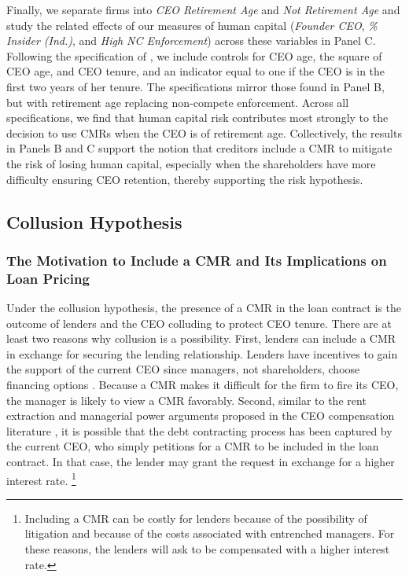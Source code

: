 \documentclass[a4paper,12pt]{article}
\begin{document}
Finally, we separate firms into \textit{CEO Retirement Age} and \textit{Not Retirement Age} and study the related effects of our measures of human capital (\textit{Founder CEO}, \textit{\% Insider (Ind.)}, and \textit{High NC Enforcement}) across these variables in Panel C.
Following the specification of \cite{Jenter_2015a}, we include controls for CEO age, the square of CEO age, and CEO tenure, and an indicator equal to one if the CEO is in the first two years of her tenure.
The specifications mirror those found in Panel B, but with retirement age replacing non-compete enforcement.
Across all specifications, we find that human capital risk contributes most strongly to the decision to use CMRs when the CEO is of retirement age.
Collectively, the results in Panels B and C support the notion that creditors include a CMR to mitigate the risk of losing human capital, especially when the shareholders have more difficulty ensuring CEO retention, thereby supporting the risk hypothesis.






\subsection{Collusion Hypothesis}

\subsubsection{The Motivation to Include a CMR and Its Implications on Loan Pricing}

Under the collusion hypothesis, the presence of a CMR in the loan contract is the outcome of lenders and the CEO colluding to protect CEO tenure.
There are at least two reasons why collusion is a possibility.
First, lenders can include a CMR in exchange for securing the lending relationship.
Lenders have incentives to gain the support of the current CEO since managers, not shareholders, choose financing options \citep{Novaes_2003}.
Because a CMR makes it difficult for the firm to fire its CEO, the manager is likely to view a CMR favorably. 
Second, similar to the rent extraction and managerial power arguments proposed in the CEO compensation literature \citep[see, e.g.,][]{Bebchuk_2003}, it is possible that the debt contracting process has been captured by the current CEO, who simply petitions for a CMR to be included in the loan contract.
In that case, the lender may grant the request in exchange for a higher interest rate.%
    \footnote{Including a CMR can be costly for lenders because of the possibility of litigation and because of the costs associated with entrenched managers. For these reasons, the lenders will ask to be compensated with a higher interest rate.}
\end{document}
